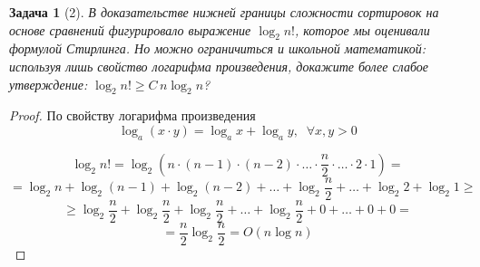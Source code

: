\documentclass[12pt]{extarticle}
\newtheorem*{problem}{Задача}
\begin{document}
\begin{problem}[2]
{\em В доказательстве нижней границы сложности сортировок на основе сравнений фигурировало выражение $\log_2{n!}$, которое мы оценивали формулой Стирлинга. Но можно ограничиться и школьной математикой: используя лишь свойство логарифма произведения, докажите более слабое утверждение: $\log_2{n!} \geqslant C\,n\log_2{n}$?}
\end{problem}

\begin{proof}
        
По свойству логарифма произведения 
$$\log_a{(x\cdot y)} = \log_a{x} + \log_a{y}, \;\;\forall x, y > 0$$

$$ \log_2{n!} = \log_2{(n\cdot (n-1)\cdot (n-2) \cdot \ldots \cdot \frac{n}{2} \cdot \ldots \cdot 2 \cdot 1)} = $$
$$   = \log_2{n} + \log_2{(n-1)}+ \log_2{(n-2)} + \ldots + \log_2{\frac{n}{2}} +\ldots + \log_2{2} + \log_2{1}  \geqslant $$
$$   \geqslant  \log_2{\frac{n}{2}} + \log_2{\frac{n}{2}}+ \log_2{\frac{n}{2}} + \ldots + \log_2{\frac{n}{2}} + 0 + \ldots + 0 + 0 = $$
$$ = \frac{n}{2} \log_2{\frac{n}{2}} = O (n \log n)$$

\end{proof}
\end{document}
